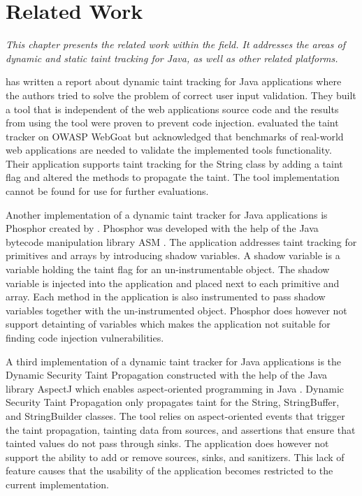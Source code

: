 \chapter{Related Work}
\label{RW}
\textit{This chapter presents the related work within the field. It addresses the areas of dynamic and static taint tracking for Java, as well as other related platforms.}

\textcite{Haldar} has written a report about dynamic taint tracking for Java applications where the authors tried to solve the problem of correct user input validation. They built a tool that is independent of the web applications source code and the results from using the tool were proven to prevent code injection. \textcite{Haldar} evaluated the taint tracker on OWASP WebGoat \parencite{webgoat} but acknowledged that benchmarks of real-world web applications are needed to validate the implemented tools functionality. Their application supports taint tracking for the String class by adding a taint flag and altered the methods to propagate the taint. The tool \textcite{Haldar} implementation cannot be found for use for further evaluations.

Another implementation of a dynamic taint tracker for Java applications is Phosphor \parencite{phosphor} created by \textcite{BellJ.2014PIdd}. Phosphor was developed with the help of the Java bytecode manipulation library ASM \parencite{asm}. The application addresses taint tracking for primitives and arrays by introducing shadow variables. A shadow variable is a variable holding the taint flag for an un-instrumentable object. The shadow variable is injected into the application and placed next to each primitive and array. Each method in the application is also instrumented to pass shadow variables together with the un-instrumented object. Phosphor does however not support detainting of variables \parencite{BellJ.2014PIdd} which makes the application not suitable for finding code injection vulnerabilities. 

A third implementation of a dynamic taint tracker for Java applications is the Dynamic Security Taint Propagation \parencite{securityTaint} constructed with the help of the Java library AspectJ which enables aspect-oriented programming in Java \parencite{aspectj}. Dynamic Security Taint Propagation only propagates taint for the String, StringBuffer, and StringBuilder classes. The tool relies on aspect-oriented events that trigger the taint propagation, tainting data from sources, and assertions that ensure that tainted values do not pass through sinks. The application does however not support the ability to add or remove sources, sinks, and sanitizers. This lack of feature causes that the usability of the application becomes restricted to the current implementation.

